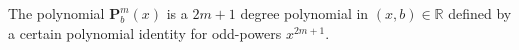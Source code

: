 The polynomial $\mathbf{P}^m_b(x)$ is a $2m+1$ degree polynomial in $(x,b) \in \mathbb{R}$
defined by a certain polynomial identity for odd-powers $x^{2m+1}$.


